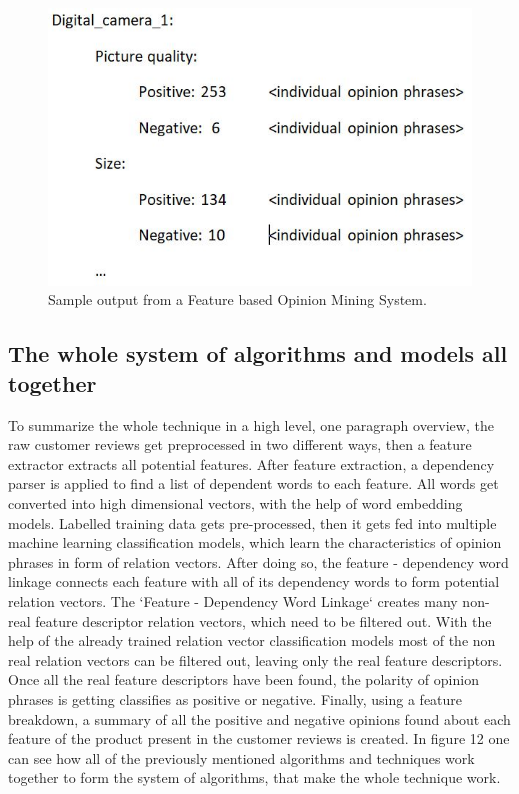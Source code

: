 \documentclass{sig-alternate}
\begin{document}
\begin{figure}
\centering
\includegraphics[scale=0.60]{images/fbom_system.JPG}
\caption{Sample output from a Feature based Opinion Mining System.}
\end{figure}

\subsection{The whole system of algorithms and models all together}
To summarize the whole technique in a high level, one paragraph overview, the raw customer reviews get preprocessed in two different ways, then a feature extractor extracts all potential features. After feature extraction, a dependency parser is applied to find a list of dependent words to each feature. All words get converted into high dimensional vectors, with the help of word embedding models. Labelled training data gets pre-processed, then it gets fed into multiple machine learning classification models, which learn the characteristics of opinion phrases in form of relation vectors. After doing so, the feature - dependency word linkage connects each feature with all of its dependency words to form potential relation vectors. The `Feature - Dependency Word Linkage` creates many non-real feature descriptor relation vectors, which need to be filtered out. With the help of the already trained relation vector classification models most of the non real relation vectors can be filtered out, leaving only the real feature descriptors.  Once all the real feature descriptors have been found, the polarity of opinion phrases is getting classifies as positive or negative. Finally, using a feature breakdown, a summary of all the positive and negative opinions found about each feature of the product present in the customer reviews is created.
In figure 12 one can see how all of the previously mentioned algorithms and techniques work together to form the system of algorithms, that make the whole technique work.
\end{document}
